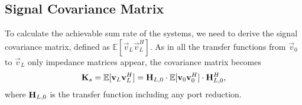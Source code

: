 \subsection{Signal Covariance Matrix}
\label{sec:sig_cov}
To calculate the achievable sum rate of the systems, we need to derive the signal covariance matrix, defined as $\mathbb{E}[\vec{v}_L\vec{v}_L^H]$.
As in all the transfer functions from $\vec{v}_0$ to $\vec{v}_L$ only impedance matrices appear, the covariance matrix becomes
\begin{equation}
\mathbf{K}_s=\mathbb{E}[\mathbf{v}_L\mathbf{v}_L^H] = \mathbf{H}_{L,0}\cdot\mathbb{E}[\mathbf{v}_0\mathbf{v}_0^H]\cdot\mathbf{H}_{L,0}^H,
\end{equation}
where $\mathbf{H}_{L,0}$ is the transfer function including any port reduction.

